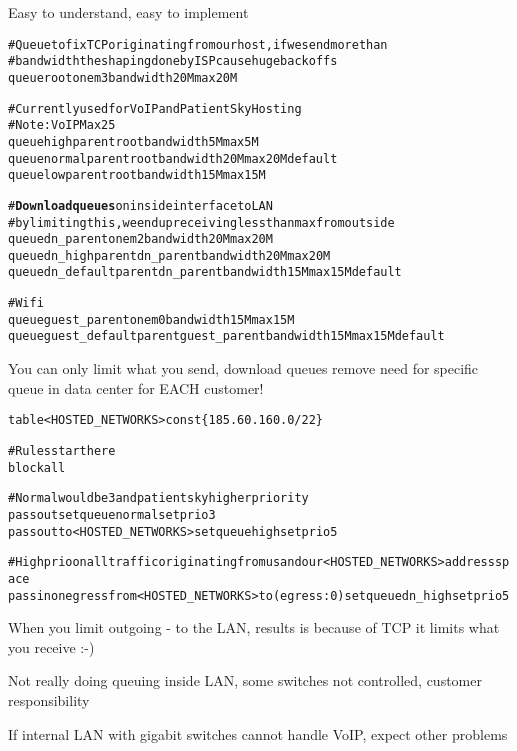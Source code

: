 \documentclass[Screen16to9,17pt]{foils}
\begin{document}
Easy to understand, easy to implement


\begin{alltt}\footnotesize
# Queue to fix TCP originating from our host, if we send more than
# bandwidth the shaping done by ISP cause huge backoffs
queue root on em3 bandwidth 20M max 20M

# Currently used for VoIP and PatientSky Hosting
# Note: VoIP Max 25% of bandwidth, excess dropped by provider!
queue high parent root bandwidth 5M max 5M
queue normal parent root bandwidth 20M max 20M default
queue low parent root bandwidth 15M max 15M

# {\bf Download queues} on inside interface to LAN
# by limiting this, we end up receiving less than max from outside
queue dn_parent on em2 bandwidth 20M max 20M
queue dn_high parent dn_parent bandwidth 20M max 20M
queue dn_default parent dn_parent bandwidth 15M max 15M default

# Wifi
queue guest_parent on em0 bandwidth 15M max 15M
queue guest_default parent guest_parent bandwidth 15M max 15M default
\end{alltt}

You can only limit what you send, download queues remove need for
specific queue in data center for EACH customer!


\begin{alltt}\footnotesize
table <HOSTED_NETWORKS> const \{ 185.60.160.0/22 \}

# Rules start here
block all

# Normal would be 3 and patientsky higher priority
pass out set queue normal set prio 3
pass out to <HOSTED_NETWORKS> set queue high set prio 5

# High prio on all traffic originating from us and our <HOSTED_NETWORKS> address space
pass in on egress from <HOSTED_NETWORKS> to (egress:0) set queue dn_high set prio 5
\end{alltt}

\begin{list2}
\item When you limit outgoing - to the LAN, results is because of TCP it limits what you receive :-)
\item Not really doing queuing inside LAN, some switches not controlled, customer responsibility
\item If internal LAN with gigabit switches cannot handle VoIP, expect other problems
\end{list2}
\end{document}
